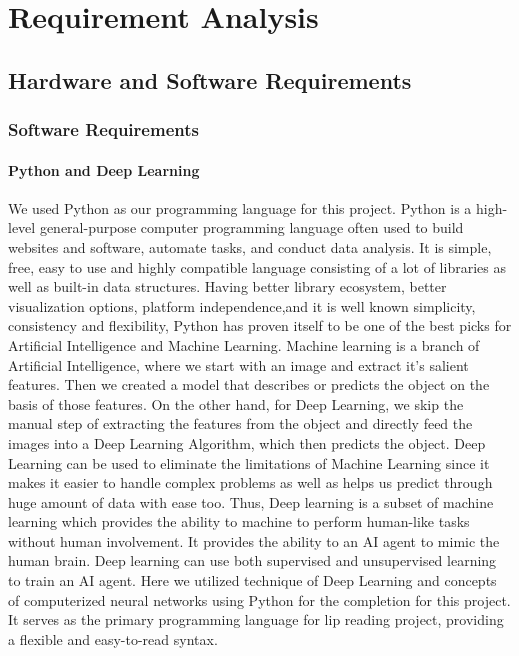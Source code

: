       \chapter{Requirement Analysis}
      \section{Hardware and Software Requirements}
	\subsection{Software Requirements}
 	\subsubsection{Python and Deep Learning}
We used Python as our programming language for this project. Python is a high-level general-purpose computer programming language often used to build websites and software, automate tasks, and conduct data analysis. It is simple, free, easy to use and highly compatible language consisting of a lot of libraries as well as built-in data structures. Having better library ecosystem, better visualization options, platform independence,and it is well known simplicity, consistency and flexibility, Python has proven itself to be one of the best picks for Artificial Intelligence and Machine Learning. Machine learning is a branch of Artificial Intelligence, where we start with an image and extract it’s salient features. Then we created a model that describes or predicts the object on the basis of those features. On the other hand, for Deep Learning, we skip the manual step of extracting the features from the object and directly feed the images into a Deep Learning Algorithm, which then predicts the object. Deep Learning can be used to eliminate the limitations of Machine Learning since it makes it easier to handle complex problems as well as helps us predict through huge amount of data with ease too. Thus, Deep learning is a subset of machine learning which provides the ability to machine to perform human-like tasks without human involvement. It provides the ability to an AI agent to mimic the human brain. Deep learning can use both supervised and unsupervised learning to train an AI agent. Here we utilized technique of Deep Learning and concepts of computerized neural networks using Python for the completion for this project. It serves as the primary programming language for lip reading project, providing a flexible and easy-to-read syntax.


